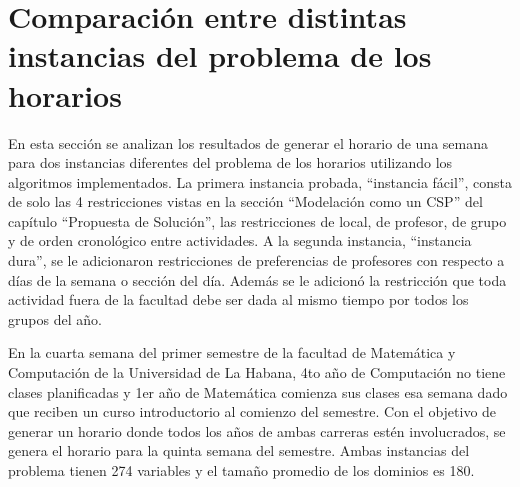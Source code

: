 \section{Comparaci\'on entre distintas instancias del problema de los horarios}

En esta secci\'on se analizan los resultados de generar el horario de una semana para dos instancias diferentes del problema de los horarios utilizando los algoritmos implementados. La primera instancia probada, ``instancia f\'acil'', consta de solo las 4 restricciones vistas en la secci\'on ``Modelaci\'on como un CSP'' del cap\'itulo ``Propuesta de Solución'', las restricciones de local, de profesor, de grupo y de orden cronol\'ogico entre actividades. A la segunda instancia, ``instancia dura'', se le adicionaron restricciones de preferencias de profesores con respecto a d\'ias de la semana o secci\'on del d\'ia. Adem\'as se le adicion\'o la restricci\'on que toda actividad fuera de la facultad debe ser dada al mismo tiempo por todos los grupos del año.

En la cuarta semana del primer semestre de la facultad de Matem\'atica y Computaci\'on de la Universidad de La Habana, 4to año de Computaci\'on no tiene clases planificadas y 1er año de Matem\'atica comienza sus clases esa semana dado que reciben un curso introductorio al comienzo del semestre. Con el objetivo de generar un horario donde todos los años de ambas carreras est\'en involucrados, se genera el horario para la quinta semana del semestre. Ambas instancias del problema tienen 274 variables y el tamaño promedio de los dominios es 180.

